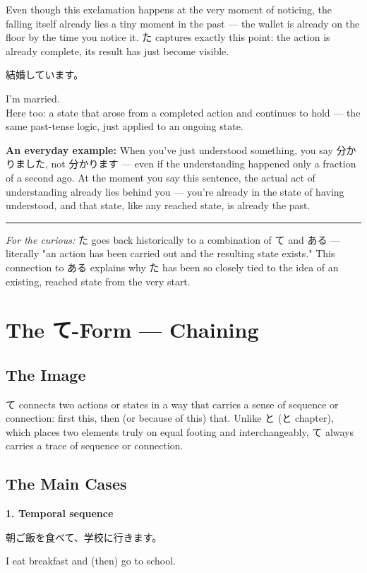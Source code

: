 \documentclass[12pt]{book}
\begin{document}
Even though this exclamation happens at the very moment of noticing, the falling itself already lies a tiny moment in the past — the wallet is already on the floor by the time you notice it. た captures exactly this point: the action is already complete, its result has just become visible.

\par\quad 結婚しています。\\
\par\quad I'm married.\\

Here too: a state that arose from a completed action and continues to hold — the same past-tense logic, just applied to an ongoing state.

\textbf{An everyday example:} When you've just understood something, you say 分かりました, not 分かります — even if the understanding happened only a fraction of a second ago. At the moment you say this sentence, the actual act of understanding already lies behind you — you're already in the state of having understood, and that state, like any reached state, is already the past.

\bigskip\hrule\bigskip

\emph{For the curious:} た goes back historically to a combination of て and ある — literally "an action has been carried out and the resulting state exists." This connection to ある explains why た has been so closely tied to the idea of an existing, reached state from the very start.


\chapter{The て-Form — Chaining}

\section*{The Image}

て connects two actions or states in a way that carries a sense of sequence or connection: first this, then (or because of this) that. Unlike と (と chapter), which places two elements truly on equal footing and interchangeably, て always carries a trace of sequence or connection.

\section*{The Main Cases}

\textbf{1. Temporal sequence}
\par\quad 朝ご飯を食べて、学校に行きます。\\
\par\quad I eat breakfast and (then) go to school.\\
\end{document}

